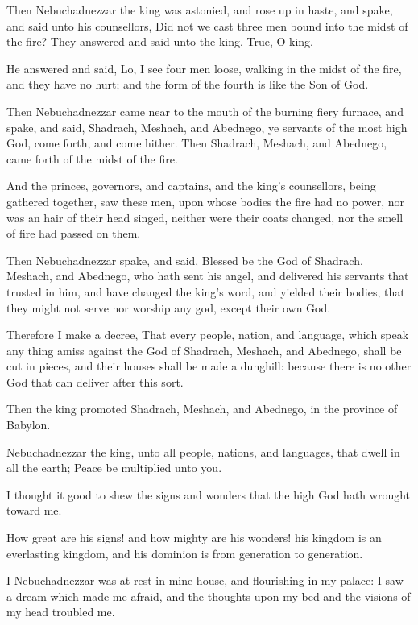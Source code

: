 \Verse Then Nebuchadnezzar the king was astonied, and rose up in haste, and spake, and said unto his counsellors, Did not we cast three men bound into the midst of the fire? They answered and said unto the king, True, O king.

\Verse He answered and said, Lo, I see four men loose, walking in the midst of the fire, and they have no hurt; and the form of the fourth is like the Son of God.

\Verse Then Nebuchadnezzar came near to the mouth of the burning fiery furnace, and spake, and said, Shadrach, Meshach, and Abednego, ye servants of the most high God, come forth, and come hither. Then Shadrach, Meshach, and Abednego, came forth of the midst of the fire.

\Verse And the princes, governors, and captains, and the king's counsellors, being gathered together, saw these men, upon whose bodies the fire had no power, nor was an hair of their head singed, neither were their coats changed, nor the smell of fire had passed on them.

\Verse Then Nebuchadnezzar spake, and said, Blessed be the God of Shadrach, Meshach, and Abednego, who hath sent his angel, and delivered his servants that trusted in him, and have changed the king's word, and yielded their bodies, that they might not serve nor worship any god, except their own God.

\Verse Therefore I make a decree, That every people, nation, and language, which speak any thing amiss against the God of Shadrach, Meshach, and Abednego, shall be cut in pieces, and their houses shall be made a dunghill: because there is no other God that can deliver after this sort.

\Verse Then the king promoted Shadrach, Meshach, and Abednego, in the province of Babylon.


\Chapter
\Verse Nebuchadnezzar the king, unto all people, nations, and languages, that dwell in all the earth; Peace be multiplied unto you.

\Verse I thought it good to shew the signs and wonders that the high God hath wrought toward me.

\Verse How great are his signs! and how mighty are his wonders! his kingdom is an everlasting kingdom, and his dominion is from generation to generation.

\Verse I Nebuchadnezzar was at rest in mine house, and flourishing in my palace: \Verse I saw a dream which made me afraid, and the thoughts upon my bed and the visions of my head troubled me.

